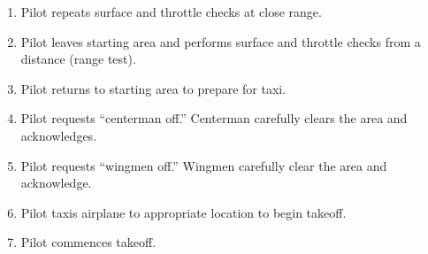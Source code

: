 \documentclass[10pt]{report}
\begin{document}
\begin{enumerate}
	\item Pilot repeats surface and throttle checks at close range.
	\item Pilot leaves starting area and performs surface and throttle checks from a distance (range test).
	\item Pilot returns to starting area to prepare for taxi.
	\item Pilot requests ``centerman off.''  Centerman carefully clears the area and acknowledges.
	\item Pilot requests ``wingmen off.''  Wingmen carefully clear the area and acknowledge.
	\item Pilot taxis airplane to appropriate location to begin takeoff.
	\item Pilot commences takeoff.

\end{enumerate}




\end{document}
